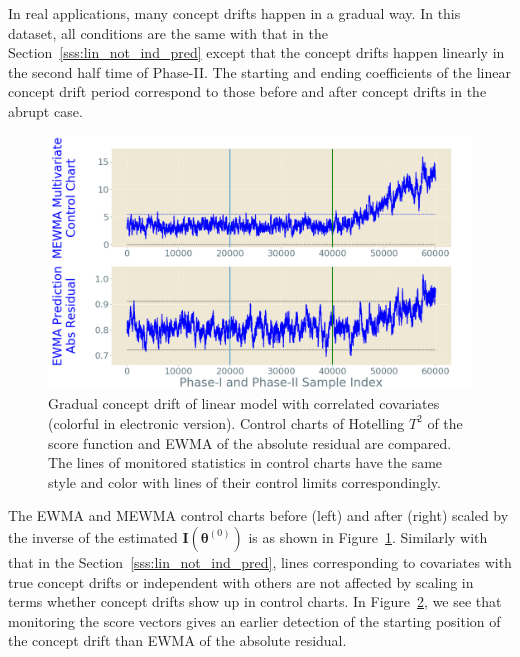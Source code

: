 \documentclass[twoside,11pt]{article}
\begin{document}
\begin{enumerate}[(I)]
\begin{figure}[!htbp]
  \label{fig:lin_reg_not_ind_X_grad_cd}
\end{figure}
In real applications, many concept drifts happen in a gradual way. In this dataset, all conditions are the same with that in the Section~\ref{sss:lin_not_ind_pred} except that the concept drifts happen linearly in the second half time of Phase-II. The starting and ending coefficients of the linear concept drift period correspond to those before and after concept drifts in the abrupt case. 
\begin{figure}[!htbp]
\centering
\includegraphics[width = 0.6\linewidth, trim=0in 2.6in 0in 0in, clip]{../figures/v14/sim_6/reg/1_sim6_lin_1e-08_0_005_1.png}
  \caption{Gradual concept drift of linear model with correlated covariates (colorful in electronic version). Control charts of Hotelling $T^2$ of the score function and EWMA of the absolute residual are compared. The lines of monitored statistics in control charts have the same style and color with lines of their control limits correspondingly.}
  \label{fig:lin_reg_ind_X_grad_cd_comp}
\end{figure}

The EWMA and MEWMA control charts before (left) and after (right) scaled by {the inverse of the estimated} ${\mathbf {I}}(\bm { \theta}^{(0)})$ is as shown in Figure~\ref{fig:lin_reg_not_ind_X_grad_cd}. Similarly with that in the Section~\ref{sss:lin_not_ind_pred}, lines corresponding to covariates with true concept drifts or independent with others are not affected by scaling in terms whether concept drifts show up in control charts. In Figure~\ref{fig:lin_reg_ind_X_grad_cd_comp}, we see that monitoring the score vectors gives an earlier detection of the starting position of the concept drift than EWMA of the absolute residual.
\end{enumerate}
\end{document}
